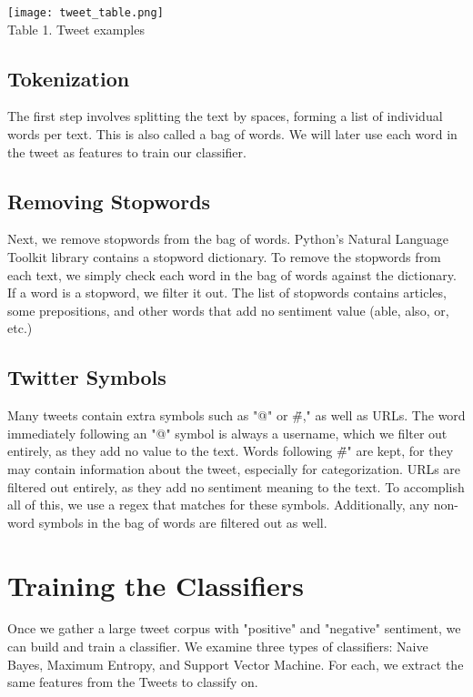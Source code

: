 \documentclass[preprint,pre,floats,aps,amsmath,amssymb,12pt]{revtex4}
\begin{document}
\texttt{[image: tweet\_table.png]}\\
Table 1. Tweet examples

\subsection{Tokenization}

The first step involves splitting the text by spaces, forming a list of individual words per text. This is also called a bag of words. We will later use each word in the tweet as features to train our classifier. 

\subsection{Removing Stopwords}

Next, we remove stopwords from the bag of words. Python's Natural Language Toolkit library contains a stopword dictionary. To remove the stopwords from each text, we simply check each word in the bag of words against the dictionary. If a word is a stopword, we filter it out. The list of stopwords contains articles, some prepositions, and other words that add no sentiment value (able, also, or, etc.)

\subsection{Twitter Symbols}

Many tweets contain extra symbols such as "@" or \"\#," as well as URLs. The word immediately following an "@" symbol is always a username, which we filter out entirely, as they add no value to the text. Words following \"\#" are kept, for they may contain information about the tweet, especially for categorization. URLs are filtered out entirely, as they add no sentiment meaning to the text. To accomplish all of this, we use a regex that matches for these symbols.  Additionally, any non-word symbols in the bag of words are filtered out as well.

\section{Training the Classifiers}
\label{sec:train}

Once we gather a large tweet corpus with "positive" and "negative" sentiment, we can build and train a classifier. We examine three types of classifiers: Naive Bayes, Maximum Entropy, and Support Vector Machine. For each, we extract the same features from the Tweets to classify on.
\end{document}
